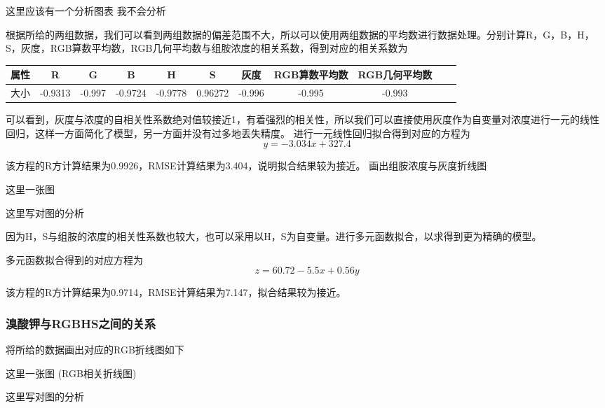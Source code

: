     这里应该有一个分析图表 我不会分析

    根据所给的两组数据，我们可以看到两组数据的偏差范围不大，所以可以使用两组数据的平均数进行数据处理。分别计算R，G，B，H，S，灰度，RGB算数平均数，RGB几何平均数与组胺浓度的相关系数，得到对应的相关系数为
    \begin{table}
        \begin{tabular}{|c|c|c|c|c|c|c|c|c|c|c|}
        \hline
            属性 & R & G & B & H & S & 灰度 & RGB算数平均数 & RGB几何平均数 \\
        \hline
            大小 & -0.9313 & -0.997 & -0.9724 & -0.9778 & 0.96272 & -0.996 & -0.995 & -0.993 \\
        \hline
        \end{tabular}
    \end{table}



    可以看到，灰度与浓度的自相关性系数绝对值较接近1，有着强烈的相关性，所以我们可以直接使用灰度作为自变量对浓度进行一元的线性回归，这样一方面简化了模型，另一方面并没有过多地丢失精度。
   进行一元线性回归拟合得到对应的方程为
    $$ y = -3.034 x + 327.4$$

    该方程的R方计算结果为0.9926，RMSE计算结果为3.404，说明拟合结果较为接近。
    画出组胺浓度与灰度折线图

    这里一张图

    这里写对图的分析

    因为H，S与组胺的浓度的相关性系数也较大，也可以采用以H，S为自变量。进行多元函数拟合，以求得到更为精确的模型。

    多元函数拟合得到的对应方程为
    $$ z = 60.72 - 5.5 x + 0.56y$$

    该方程的R方计算结果为0.9714，RMSE计算结果为7.147，拟合结果较为接近。

    \subsubsection{溴酸钾与RGBHS之间的关系}

    将所给的数据画出对应的RGB折线图如下

    这里一张图 (RGB相关折线图)

    这里写对图的分析

